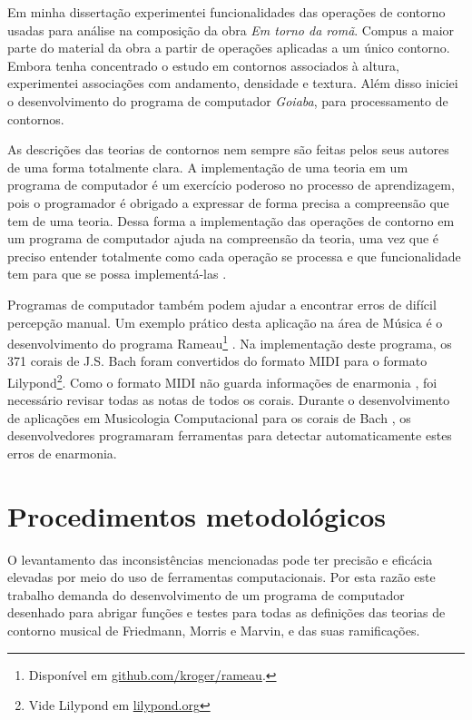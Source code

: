 \documentclass[12pt]{article}
\newcommand{\goiaba}[0]{\textit{Goiaba}}
\newcommand{\obra}[0]{\textit{Em torno da romã}}
\begin{document}

Em minha dissertação \cite{sampaio08:em} experimentei funcionalidades
das operações de contorno usadas para análise na composição da obra
\obra{}. Compus a maior parte do material da obra a partir de
operações aplicadas a um único contorno. Embora tenha concentrado o
estudo em contornos associados à altura, experimentei associações com
andamento, densidade e textura. Além disso iniciei o desenvolvimento
do programa de computador \goiaba{}, para processamento de contornos.

As descrições das teorias de contornos nem sempre são feitas pelos
seus autores de uma forma totalmente clara. A implementação de uma
teoria em um programa de computador é um exercício poderoso no
processo de aprendizagem, pois o programador é obrigado a expressar de
forma precisa a compreensão que tem de uma teoria. Dessa forma a
implementação das operações de contorno em um programa de computador
ajuda na compreensão da teoria, uma vez que é preciso entender
totalmente como cada operação se processa e que funcionalidade tem
para que se possa implementá-las \cite{sampaio08:em}.

Programas de computador também podem ajudar a encontrar erros de
difícil percepção manual. Um exemplo prático desta aplicação na área
de Música é o desenvolvimento do programa Rameau\footnote{Disponível
  em \url{github.com/kroger/rameau}.}
\cite{kroger08:rameau,passos.ea09:functional}. Na implementação deste
programa, os 371 corais de J.S. Bach foram convertidos do formato MIDI
para o formato Lilypond\footnote{Vide Lilypond em
  \url{lilypond.org}}. Como o formato MIDI não guarda informações de
enarmonia \cite{selfridge-field97:beyond}, foi necessário revisar
todas as notas de todos os corais. Durante o desenvolvimento de
aplicações em Musicologia Computacional para os corais de Bach
\cite{kroger08:musicologia}, os desenvolvedores programaram
ferramentas para detectar automaticamente estes erros de enarmonia.

\section{Procedimentos metodológicos}
\label{sec:metodologia}

O levantamento das inconsistências mencionadas pode ter precisão e
eficácia elevadas por meio do uso de ferramentas computacionais. Por
esta razão este trabalho demanda do desenvolvimento de um programa de
computador desenhado para abrigar funções e testes para todas as
definições das teorias de contorno musical de Friedmann, Morris e
Marvin, e das suas ramificações.
\end{document}
